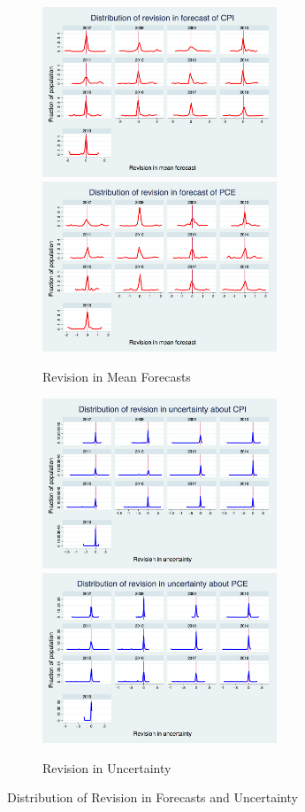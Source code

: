 \documentclass[12pt]{article}
\begin{document}
	
	\begin{figure}[ht]
		\begin{subfigure}[b]{0.5\textwidth}
		\centering
		\caption{Revision in Mean Forecasts}
		\includegraphics[width=7cm]{figures/PRCCPIMean01_rv_true_hist.png} 
		\smallskip
		\includegraphics[width=7cm]{figures/PRCPCEMean01_rv_true_hist.png} 
		\end{subfigure}
		   \hfill 
		\begin{subfigure}[b]{0.5\textwidth}
					\caption{Revision in Uncertainty}
		\includegraphics[width=7cm]{figures/PRCCPIVar01_rv_true_hist.png}  
		\smallskip
		\includegraphics[width=7cm]{figures/PRCPCEVar01_rv_true_hist.png} 
		\end{subfigure}
		\caption{Distribution of Revision in Forecasts and Uncertainty}
		\label{RevisionHist}
	\end{figure}
	
\end{document}
